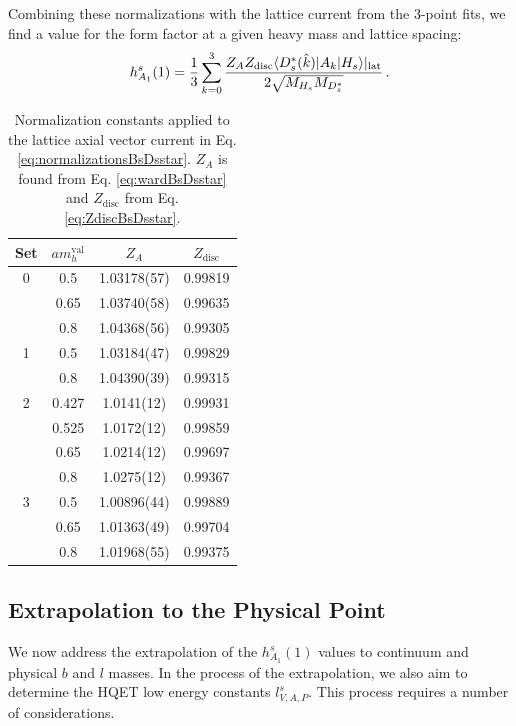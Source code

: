 Combining these normalizations with the lattice current from the 3-point fits, we find a value for the form factor at a given heavy mass and lattice spacing:
\begin{align}
  h_{A_1}^s(1) = {1\over 3} \sum_{k=0}^3 { Z_A Z_{\text{disc}}\langle D_s^*(\hat{k}) | A_k | H_s \rangle |_{\text{lat}}\over 2\sqrt{M_{H_s} M_{D_s^*}} }\,.
  \label{eq:normalizationsBsDsstar}
\end{align}

\begin{table}
\begin{center}
\begin{tabular}{ c c c c }
\hline
Set & $am_h^{\text{val}}$ & $Z_A$& $Z_{\text{disc}}$\\ [0.5ex]
\hline
0 & 0.5 & 1.03178(57) & 0.99819\\ [0.5ex] 
 & 0.65 & 1.03740(58) & 0.99635\\ [0.5ex] 
 & 0.8 & 1.04368(56) & 0.99305\\ [0.5ex] 
\hline
1 & 0.5 & 1.03184(47) & 0.99829\\ [0.5ex] 
 & 0.8 & 1.04390(39) & 0.99315\\ [0.5ex] 
\hline
2 & 0.427 & 1.0141(12) & 0.99931\\ [0.5ex] 
 & 0.525 & 1.0172(12) & 0.99859\\ [0.5ex] 
 & 0.65 & 1.0214(12) & 0.99697\\ [0.5ex] 
 & 0.8 & 1.0275(12) & 0.99367\\ [0.5ex] 
\hline
3 & 0.5 & 1.00896(44) & 0.99889\\ [0.5ex] 
 & 0.65 & 1.01363(49) & 0.99704\\ [0.5ex] 
 & 0.8 & 1.01968(55) & 0.99375\\ [0.5ex] 
\hline
\end{tabular}
\caption{Normalization constants applied to the lattice axial vector current in Eq. \eqref{eq:normalizationsBsDsstar}. $Z_A$ is found from Eq. \eqref{eq:wardBsDsstar} and $Z_{\text{disc}}$ from Eq. \eqref{eq:ZdiscBsDsstar}. \label{tab:norms}}
\end{center}
\end{table}


\subsection{Extrapolation to the Physical Point}
\label{sec:BsDsstar_extrapolation}

We now address the extrapolation of the $h_{A_1}^s(1)$ values to continuum and physical $b$ and $l$ masses. In the process of the extrapolation, we also aim to determine the HQET low energy constants $l^s_{V,A,P}$. This process requires a number of considerations.


